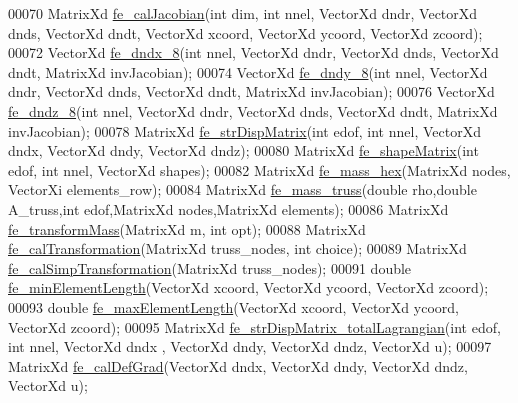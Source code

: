 \begin{DoxyCode}
00070 MatrixXd \hyperlink{functions_8h_a5ae3771e65b4a0d177097041a4349c28}{fe\_calJacobian}(\textcolor{keywordtype}{int} dim, \textcolor{keywordtype}{int} nnel, VectorXd dndr, VectorXd dnds, VectorXd dndt, 
      VectorXd xcoord, VectorXd ycoord, VectorXd zcoord);
00072 VectorXd \hyperlink{functions_8h_afc6be1a5667e68156cb099e8da71170f}{fe\_dndx\_8}(\textcolor{keywordtype}{int} nnel, VectorXd dndr, VectorXd dnds, VectorXd dndt, MatrixXd invJacobian);
00074 VectorXd \hyperlink{functions_8h_a0572d7818e085c67f7fbb84eef8ecfb4}{fe\_dndy\_8}(\textcolor{keywordtype}{int} nnel, VectorXd dndr, VectorXd dnds, VectorXd dndt, MatrixXd invJacobian);
00076 VectorXd \hyperlink{functions_8h_aaf75db8433433807839c6ea17f2cf72c}{fe\_dndz\_8}(\textcolor{keywordtype}{int} nnel, VectorXd dndr, VectorXd dnds, VectorXd dndt, MatrixXd invJacobian);
00078 MatrixXd \hyperlink{functions_8h_a4b49d2df4f86e7d0755971ab4bfa48b2}{fe\_strDispMatrix}(\textcolor{keywordtype}{int} edof, \textcolor{keywordtype}{int} nnel, VectorXd dndx, VectorXd dndy, VectorXd dndz);
00080 MatrixXd \hyperlink{functions_8h_a98fae74dde5fe33a7062e7457a2d3227}{fe\_shapeMatrix}(\textcolor{keywordtype}{int} edof, \textcolor{keywordtype}{int} nnel, VectorXd shapes);
00082 MatrixXd \hyperlink{functions_8h_a0405e1196584e6fa36f29a2614a49f00}{fe\_mass\_hex}(MatrixXd nodes, VectorXi elements\_row);
00084 MatrixXd \hyperlink{functions_8h_a350d27ea0f1de929495d659b26f428d2}{fe\_mass\_truss}(\textcolor{keywordtype}{double} rho,\textcolor{keywordtype}{double} A\_truss,\textcolor{keywordtype}{int} edof,MatrixXd nodes,MatrixXd elements);
00086 MatrixXd \hyperlink{functions_8h_ab747d046148af042245ed13ca720c5ec}{fe\_transformMass}(MatrixXd m, \textcolor{keywordtype}{int} opt);
00088 MatrixXd \hyperlink{functions_8h_aa41c40dffea4251a07a8a3f5062f47ae}{fe\_calTransformation}(MatrixXd truss\_nodes, \textcolor{keywordtype}{int} choice);
00089 MatrixXd \hyperlink{functions_8h_ae2eeba997bf4f0bc4749b92130de7ba3}{fe\_calSimpTransformation}(MatrixXd truss\_nodes);
00091 \textcolor{keywordtype}{double} \hyperlink{functions_8h_a6b04cfa4d2533eed9667ae14f361baa6}{fe\_minElementLength}(VectorXd xcoord, VectorXd ycoord, VectorXd zcoord);
00093 \textcolor{keywordtype}{double} \hyperlink{functions_8h_aa11bdbf370d88d267313624c85c28e70}{fe\_maxElementLength}(VectorXd xcoord, VectorXd ycoord, VectorXd zcoord);
00095 MatrixXd \hyperlink{functions_8h_a8c9fd519c93c847cdf52de947964eb67}{fe\_strDispMatrix\_totalLagrangian}(\textcolor{keywordtype}{int} edof, \textcolor{keywordtype}{int} nnel, VectorXd dndx
      , VectorXd dndy, VectorXd dndz, VectorXd u);
00097 MatrixXd \hyperlink{functions_8h_ae50379f74802347e04dbc022897f9cb0}{fe\_calDefGrad}(VectorXd dndx, VectorXd dndy, VectorXd dndz, VectorXd u);

\end{DoxyCode}
